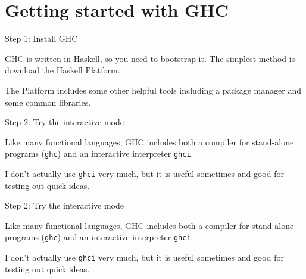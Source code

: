 
\section{Getting started with GHC}

%
\begin{frame}{Step 1: Install GHC}

GHC is written in Haskell, so you need to bootstrap it. The simplest method is
download the Haskell Platform.

The Platform includes some other helpful tools including a package manager and
some common libraries.

\end{frame}

%
\begin{frame}{Step 2: Try the interactive mode}

Like many functional languages, GHC includes both a compiler for stand-alone
programs (\texttt{ghc}) and an interactive interpreter \texttt{ghci}.

I don't actually use \texttt{ghci} very much, but it is useful sometimes and
good for testing out quick ideas.

\end{frame}

%
\begin{frame}{Step 2: Try the interactive mode}

Like many functional languages, GHC includes both a compiler for stand-alone
programs (\texttt{ghc}) and an interactive interpreter \texttt{ghci}.

I don't actually use \texttt{ghci} very much, but it is useful sometimes and
good for testing out quick ideas.

\end{frame}
